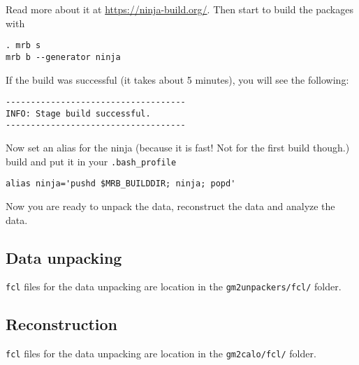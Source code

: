 %
Read more about it at \url{https://ninja-build.org/}.
Then start to build the packages with
%
\begin{Verbatim}[frame=single]
. mrb s
mrb b --generator ninja
\end{Verbatim}
%
If the build was successful (it takes about 5 minutes), you will see the following:
%
\begin{Verbatim}[frame=single]
------------------------------------
INFO: Stage build successful.
------------------------------------
\end{Verbatim}
%
Now set an alias for the ninja (because it is fast! Not for the first build though.) build and put it in your \verb+.bash_profile+
%
\begin{Verbatim}[frame=single]
alias ninja='pushd $MRB_BUILDDIR; ninja; popd'
\end{Verbatim}
%
Now you are ready to unpack the data, reconstruct the data and analyze the data.

\subsection{Data unpacking}

\verb+fcl+ files for the data unpacking are location in the \verb+gm2unpackers/fcl/+ folder.

\subsection{Reconstruction}

\verb+fcl+ files for the data unpacking are location in the \verb+gm2calo/fcl/+ folder.
